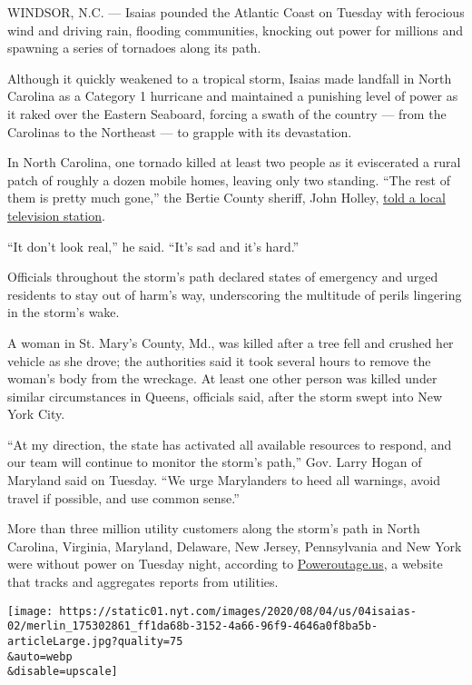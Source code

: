 WINDSOR, N.C. --- Isaias pounded the Atlantic Coast on Tuesday with
ferocious wind and driving rain, flooding communities, knocking out
power for millions and spawning a series of tornadoes along its path.

Although it quickly weakened to a tropical storm, Isaias made landfall
in North Carolina as a Category 1 hurricane and maintained a punishing
level of power as it raked over the Eastern Seaboard, forcing a swath of
the country --- from the Carolinas to the Northeast --- to grapple with
its devastation.

In North Carolina, one tornado killed at least two people as it
eviscerated a rural patch of roughly a dozen mobile homes, leaving only
two standing. ``The rest of them is pretty much gone,'' the Bertie
County sheriff, John Holley,
\href{https://www.13newsnow.com/video/news/local/north-carolina/bertie-county-sheriff-john-holley-talks-about-fatality-in-north-carolina/291-99306d30-d640-4e9a-97fa-0221d565f5df}{told
a local television station}.

``It don't look real,'' he said. ``It's sad and it's hard.''

Officials throughout the storm's path declared states of emergency and
urged residents to stay out of harm's way, underscoring the multitude of
perils lingering in the storm's wake.

A woman in St. Mary's County, Md., was killed after a tree fell and
crushed her vehicle as she drove; the authorities said it took several
hours to remove the woman's body from the wreckage. At least one other
person was killed under similar circumstances in Queens, officials said,
after the storm swept into New York City.

``At my direction, the state has activated all available resources to
respond, and our team will continue to monitor the storm's path,'' Gov.
Larry Hogan of Maryland said on Tuesday. ``We urge Marylanders to heed
all warnings, avoid travel if possible, and use common sense.''

More than three million utility customers along the storm's path in
North Carolina, Virginia, Maryland, Delaware, New Jersey, Pennsylvania
and New York were without power on Tuesday night, according to
\href{https://poweroutage.us/}{Poweroutage.us}, a website that tracks
and aggregates reports from utilities.

\texttt{[image: https://static01.nyt.com/images/2020/08/04/us/04isaias-02/merlin\_175302861\_ff1da68b-3152-4a66-96f9-4646a0f8ba5b-articleLarge.jpg?quality=75\\\&auto=webp\\\&disable=upscale]}

